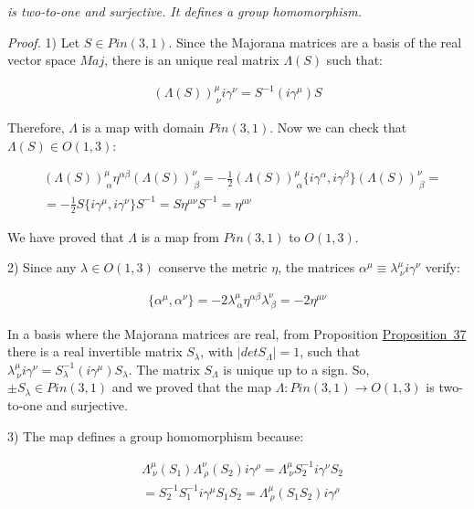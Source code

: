 \documentclass[11pt]{book}
\begin{document}
\emph{ is two-to-one and surjective. It defines a group homomorphism.}

\emph{Proof.} 1) Let \(S\in Pin(3,1)\). Since the Majorana matrices are
a basis of the real vector space \(Maj\), there is an unique real matrix
\(\Lambda(S)\) such that:

\begin{equation}\begin{aligned}
(\Lambda(S))^\mu_{\ \nu}i\gamma^\nu=S^{-1}(i\gamma^\mu)S\end{aligned}\end{equation}

Therefore, \(\Lambda\) is a map with domain \(Pin(3,1)\). Now we can
check that \(\Lambda(S)\in O(1,3)\):

\begin{equation}\begin{aligned}
&(\Lambda(S))^\mu_{\ \alpha}\eta^{\alpha\beta}(\Lambda(S))^\nu_{\
  \beta}=-\frac{1}{2}(\Lambda(S))^\mu_{\
  \alpha}\{i\gamma^\alpha,i\gamma^\beta\}(\Lambda(S))^\nu_{\
  \beta}=\\
&=-\frac{1}{2}S\{i\gamma^\mu,i\gamma^\nu\}S^{-1}=S\eta^{\mu\nu}S^{-1}=\eta^{\mu\nu}\end{aligned}\end{equation}

We have proved that \(\Lambda\) is a map from \(Pin(3,1)\) to
\(O(1,3)\).

2) Since any \(\lambda\in O(1,3)\) conserve the metric \(\eta\), the
matrices \(\alpha^\mu\equiv \lambda^\mu_{\ \nu} i\gamma^\nu\) verify:

\begin{equation}\begin{aligned}
\{\alpha^\mu,\alpha^\nu\}=-2\lambda^\mu_{\ \alpha}\eta^{\alpha\beta}\lambda^\nu_{\ \beta}=-2\eta^{\mu\nu}\end{aligned}\end{equation}

In a basis where the Majorana matrices are real, from Proposition
\protect\hyperlink{prop:realsimilar}{Proposition~37} there is a real
invertible matrix \(S_\lambda\), with \(|det S_\Lambda|=1\), such that
\(\lambda^\mu_{\ \nu} i\gamma^\nu=S^{-1}_\lambda
(i\gamma^\mu)S_\lambda\). The matrix \(S_\Lambda\) is unique up to a
sign. So, \(\pm S_\lambda\in
Pin(3,1)\) and we proved that the map \(\Lambda:Pin(3,1)\to O(1,3)\) is
two-to-one and surjective.

3) The map defines a group homomorphism because:

\begin{equation}\begin{aligned}
&\Lambda^\mu_{\ \nu}(S_1)\Lambda^\nu_{\
  \rho}(S_2)i\gamma^\rho=\Lambda^\mu_{\ \nu}S_2^{-1}i\gamma^\nu S_2\\
&=S_2^{-1}S_1^{-1}i\gamma^\mu S_1 S_2=\Lambda^\mu_{\ \rho}(S_1 S_2)i\gamma^\rho\end{aligned}\end{equation}
\end{document}
